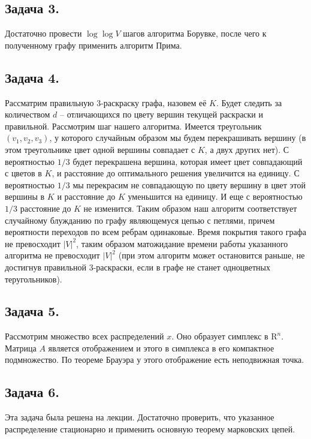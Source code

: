 \documentclass{article}
\begin{document}
\subsection*{Задача 3.}
Достаточно провести $\log \log V$ шагов алгоритма Борувке, после чего к
полученному графу применить алгоритм Прима.

\subsection*{Задача 4.}
Рассматрим правильную 3-раскраску графа, назовем её $K$.
Будет следить за количеством $d$ -- отличающихся по цвету вершин
текущей раскраски и правильной. Рассмотрим шаг нашего алгоритма.
Имеется треугольник $(v_1, v_2, v_3)$, у которого случайным образом
мы будем перекрашивать вершину (в этом треугольнике цвет одной вершины
совпадает с $K$, а двух других нет). С вероятностью $1/3$ будет перекрашена
вершина, которая имеет цвет совпадающий с цветов в $K$, и расстояние
до оптимального решения увеличится на единицу. С вероятностью $1/3$
мы перекрасим не совпадающую по цвету вершину в цвет этой вершины в $K$
и расстояние до $K$ уменьшится на единицу. И еще с вероятностью $1/3$
расстояние до $K$ не изменится. Таким образом наш алгоритм соответствует
случайному блужданию по графу являющемуся цепью с петлями, причем вероятности
переходов по всем ребрам одинаковые. Время покрытия такого графа
не превосходит $|V|^2$, таким образом матожидание времени работы
указанного алгоритма не превосходит $|V|^2$ (при этом алгоритм может
остановится раньше, не достигнув правильной 3-раскраски, если в графе
не станет одноцветных теругольников).

\subsection*{Задача 5.}
Рассмотрим множество всех распределений $x$. Оно образует
симплекс в $\mathrm{R}^n$. Матрица $A$ является отображением
и этого в симплекса в его компактное подмножество. По теореме
Брауэра у этого отображение есть неподвижная точка.

\subsection*{Задача 6.}
Эта задача была решена на лекции. Достаточно проверить, что указанное
распределение стационарно и применить основную теорему марковских цепей.
\end{document}
